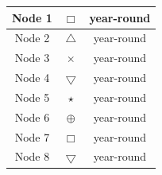 \documentclass[10pt]{article}
\begin{document}
\vspace{-.5cm}
\begin{tabular}{|c|c|c|}
\hline
{\color{red} Node 1} & $\Box$ & year-round \\
\hline
{\color{orange} Node 2} & $\triangle$ & year-round \\
\hline
{\color{yellow} Node 3} & $\times$ &  year-round \\
\hline
{\color{green} Node 4} & $\bigtriangledown$ & year-round \\
\hline
{\color{blue} Node 5} & $\star$ & year-round \\
\hline
{\color{purple} Node 6} & $\oplus$ & year-round \\
\hline
{\color{magenta} Node 7} & $\Box$ & year-round \\
\hline
{\color{cyan} Node 8} & $\bigtriangledown$ & year-round \\
\hline
\end{tabular}
\end{document}
